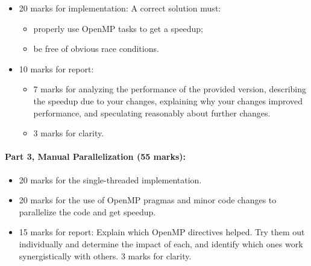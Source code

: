 \documentclass[letterpaper,10pt]{article}
\begin{document}
\begin{itemize}
\item 20 marks for implementation: A correct solution must:
\begin{itemize}
	\item properly use OpenMP tasks to get a speedup;
	\item be free of obvious race conditions.
\end{itemize}
\item 10 marks for report: 
\begin{itemize}
\item 7 marks for analyzing the performance
of the provided version, describing the speedup due to your
changes, explaining why your changes improved performance, and
speculating reasonably about further changes. 
\item 3 marks for clarity.
\end{itemize}
\end{itemize}

\paragraph{Part 3, Manual Parallelization (55 marks):} 
\begin{itemize}
\item 20 marks for the single-threaded implementation. 

\item 20 marks for the use of OpenMP pragmas and minor code changes to parallelize the code and get speedup.

\item 15 marks for report: Explain which OpenMP directives helped. Try them out individually and determine the impact of each, and identify which ones work synergistically with others. 3 marks for clarity.
\end{itemize}
\end{document}
